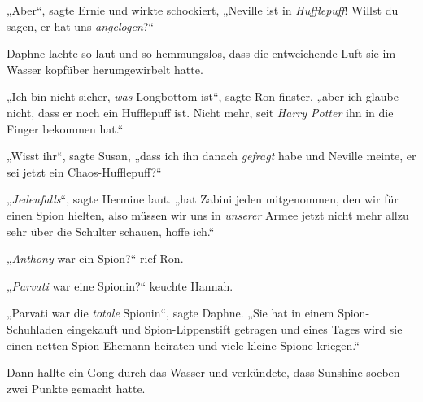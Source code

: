 „Aber“, sagte Ernie und wirkte schockiert, „Neville ist in \emph{Hufflepuff}! Willst du sagen, er hat uns \emph{angelogen}?“

Daphne lachte so laut und so hemmungslos, dass die entweichende Luft sie im Wasser kopfüber herumgewirbelt hatte.

„Ich bin nicht sicher, \emph{was} Longbottom ist“, sagte Ron finster, „aber ich glaube nicht, dass er noch ein Hufflepuff ist. Nicht mehr, seit \emph{Harry Potter} ihn in die Finger bekommen hat.“

„Wisst ihr“, sagte Susan, „dass ich ihn danach \emph{gefragt} habe und Neville meinte, er sei jetzt ein Chaos-Hufflepuff?“

„\emph{Jedenfalls}“, sagte Hermine laut. „hat Zabini jeden mitgenommen, den wir für einen Spion hielten, also müssen wir uns in \emph{unserer} Armee jetzt nicht mehr allzu sehr über die Schulter schauen, hoffe ich.“

„\emph{Anthony} war ein Spion?“ rief Ron.

„\emph{Parvati} war eine Spionin?“ keuchte Hannah.

„Parvati war die \emph{totale} Spionin“, sagte Daphne. „Sie hat in einem Spion-Schuhladen eingekauft und Spion-Lippenstift getragen und eines Tages wird sie einen netten Spion-Ehemann heiraten und viele kleine Spione kriegen.“

Dann hallte ein Gong durch das Wasser und verkündete, dass Sunshine soeben zwei Punkte gemacht hatte.

